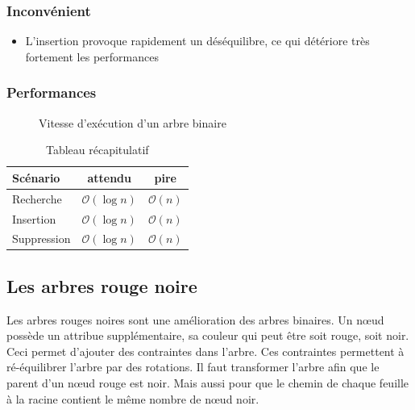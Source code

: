 \documentclass[hidelinks,a4paper, 12pt]{article}
\begin{document}
	\subsubsection*{Inconvénient}
	\begin{itemize}
		\item L'insertion provoque rapidement un déséquilibre, ce qui détériore très fortement les performances
	\end{itemize}
	\subsubsection*{Performances}
	\begin{figure}[h]
		\centering
		\caption{Vitesse d'exécution d'un arbre binaire}
	\end{figure}
	\begin{table}[h]
		\begin{tabular}{|l|c|c|}
			\hline
			Scénario & attendu & pire \\
			\hline
			Recherche & $\mathcal{O}(\log n)$ & $\mathcal{O}(n)$ \\ 
			\hline
			Insertion & $\mathcal{O}(\log n)$ & $\mathcal{O}(n)$ \\
			\hline
			Suppression & $\mathcal{O}(\log n)$ & $\mathcal{O}(n)$\\
			\hline
		\end{tabular}
		\caption{Tableau récapitulatif}
	\end{table}
	
	\subsection{Les arbres rouge noire}
	Les arbres rouges noires sont une amélioration des arbres binaires. Un nœud possède un attribue supplémentaire, sa couleur qui peut être soit rouge, soit noir. Ceci permet d'ajouter des contraintes dans l'arbre. Ces contraintes permettent à ré-équilibrer l'arbre par des rotations. Il faut transformer l'arbre afin que le parent d'un nœud rouge est noir. Mais aussi pour que le chemin de chaque feuille à la racine contient le même nombre de nœud noir.
	
\end{document}
